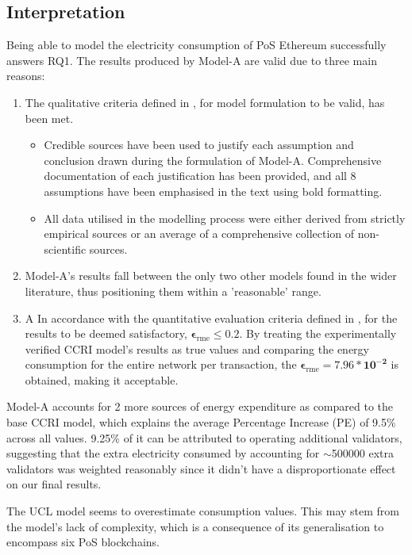 \subsection{Interpretation}

Being able to model the electricity consumption of PoS Ethereum successfully answers RQ1. The results produced by Model-A are valid due to three main reasons:
\begin{enumerate}
    \item The qualitative criteria defined in , for model formulation to be valid, has been met. 
    \begin{itemize}
        \item Credible sources have been used to justify each assumption and conclusion drawn during the formulation of Model-A. Comprehensive documentation of each justification has been provided, and all 8 assumptions have been emphasised in the text using bold formatting.
        \item All data utilised in the modelling process were either derived from strictly empirical sources or an average of a comprehensive collection of non-scientific sources.
    \end{itemize}
    \item Model-A's results fall between the only two other models found in the wider literature, thus positioning them within a 'reasonable' range.
    \item A In accordance with the quantitative evaluation criteria defined in , for the results to be deemed satisfactory, $\boldsymbol{\epsilon_\mathrm{rme} \leq 0.2}$. By treating the experimentally verified CCRI model's results as true values and comparing the energy consumption for the entire network per transaction, the $\boldsymbol{\epsilon_\mathrm{rme} = 7.96 * 10^{-2}}$ is obtained, making it acceptable.   
\end{enumerate}

Model-A accounts for 2 more sources of energy expenditure as compared to the base CCRI model, which explains the average Percentage Increase (PE) of 9.5\% across all values. 9.25\% of it can be attributed to operating additional validators, suggesting that the extra electricity consumed by accounting for $\sim$500000 extra validators was weighted reasonably since it didn't have a disproportionate effect on our final results. 

The UCL model seems to overestimate consumption values. This may stem from the model's lack of complexity, which is a consequence of its generalisation to encompass six PoS blockchains.

